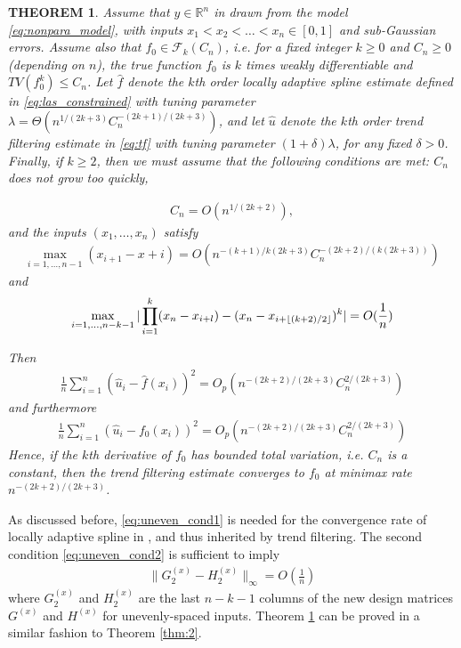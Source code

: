 \documentclass[a4paper]{article}
\DeclarePairedDelimiter\floor{\lfloor}{\rfloor}
\newtheorem{theorem}{THEOREM}
\newcommand{\RR}{\mathbb{R}}
\renewcommand{\cal}{\mathcal}
\begin{document}
\begin{theorem}
Assume that $y\in\RR^n$ in drawn from the model \eqref{eq:nonpara_model}, with inputs $x_1<x_2<\ldots<x_n\in[0,1]$ and sub-Gaussian errors. Assume also that $f_0\in\cal{F}_k(C_n)$, i.e. for a fixed integer $k\geq 0$ and $C_n\geq 0$ (depending on $n$), the true function $f_0$ is $k$ times weakly differentiable and $TV(f_0^{k})\leq C_n$. Let $\hat{f}$ denote the $k$th order locally adaptive spline estimate defined in \eqref{eq:las_constrained} with tuning parameter $\lambda = \Theta(n^{1/(2k+3)}C_n^{-(2k+1)/(2k+3)})$, and let $\hat{u}$ denote the $k$th order trend filtering estimate in \eqref{eq:tf} with tuning parameter $(1+\delta)\lambda$, for any fixed $\delta >0$. Finally, if $k\geq 2$, then we must assume that the following conditions are met: $C_n$ does not grow too quickly,

\begin{align*}
C_n = O(n^{1/(2k+2)}),
\end{align*}
and the inputs $(x_1,\ldots, x_n)$ satisfy
\begin{align}
\max_{i=1,\ldots, n-1} (x_{i+1}-x+i) = O(n^{-(k+1)/k(2k+3)}C_n^{-(2k+2)/(k(2k+3))})
\label{eq:uneven_cond1}
\end{align}
and
\begin{align}
\max_{i=1,\ldots,n-k-1} |\prod_{i=1}^k(x_n-x_{i+l}) - (x_n-x_{i+\floor{(k+2)/2}})^k| = O(\frac{1}{n})
\label{eq:uneven_cond2}
\end{align}

Then 
\begin{align*}
\frac{1}{n}\sum_{i=1}^n (\hat{u}_i - \hat{f}(x_i))^2 = O_p(n^{-(2k+2)/(2k+3)}C_n^{2/(2k+3)})
\end{align*}
and furthermore
\begin{align*}
\frac{1}{n}\sum_{i=1}^n (\hat{u}_i-f_0(x_i))^2 = O_p(n^{-(2k+2)/(2k+3)}C_n^{2/(2k+3)})
\end{align*}
Hence, if the $k$th derivative of $f_0$ has bounded total variation, i.e. $C_n$ is a constant, then the trend filtering estimate converges to $f_0$ at minimax rate $n^{-(2k+2)/(2k+3)}$.
\label{thm:3}
\end{theorem}

As discussed before, \eqref{eq:uneven_cond1} is needed for the convergence rate of locally adaptive spline in \cite{mammen1997locally}, and thus inherited by trend filtering. The second condition \eqref{eq:uneven_cond2} is sufficient to imply
\begin{align*}
\|G_2^{(x)} - H_2^{(x)}\|_\infty = O(\frac{1}{n})
\end{align*}
where $G_2^{(x)}$ and $H_2^{(x)}$ are the last $n-k-1$ columns of the new design matrices $G^{(x)}$ and $H^{(x)}$ for unevenly-spaced inputs. Theorem \ref{thm:3} can be proved in a similar fashion to Theorem \ref{thm:2}.
\end{document}
